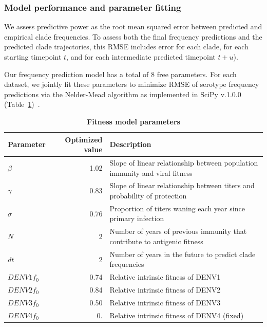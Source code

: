 \documentclass[11pt,oneside,letterpaper]{article}
\begin{document}
\subsubsection{Model performance and parameter fitting}
We assess predictive power as the root mean squared error between predicted and empirical clade frequencies.
To assess both the final frequency predictions and the predicted clade trajectories, this RMSE includes error for each clade, for each starting timepoint $t$, and for each intermediate predicted timepoint $t+u$).

Our frequency prediction model has a total of 8 free parameters.
For each dataset, we jointly fit these parameters to minimize RMSE of serotype frequency predictions via the Nelder-Mead algorithm as implemented in SciPy v.1.0.0 (Table~\ref{fitness_model_parameters})~\citep{Jones:2001aa,gao2012implementing}.

\begin{table}[ht!]
  \begin{center}
    \label{fitness_model_parameters}
    \begin{tabular}{l|r|l}
      Parameter & Optimized value & Description\\
      \hline
      $\beta$ & 1.02 & Slope of linear relationship between population immunity and viral fitness\\
      $\gamma$ & 0.83 & Slope of linear relationship between titers and probability of protection\\
      $\sigma$ & 0.76 & Proportion of titers waning each year since primary infection\\
      $N$ & 2 & Number of years of previous immunity that contribute to antigenic fitness\\
      $dt$ & 2 & Number of years in the future to predict clade frequencies\\
      $DENV1 f_{0}$ & 0.74 & Relative intrinsic fitness of DENV1\\
      $DENV2 f_{0}$ & 0.84 & Relative intrinsic fitness of DENV2\\
      $DENV3 f_{0}$ & 0.50 & Relative intrinsic fitness of DENV3\\
      $DENV4 f_{0}$ & 0. & Relative intrinsic fitness of DENV4 (fixed)\\
    \end{tabular}
    \caption{
    \textbf{Fitness model parameters}
    }
  \end{center}
\end{table}
\end{document}
